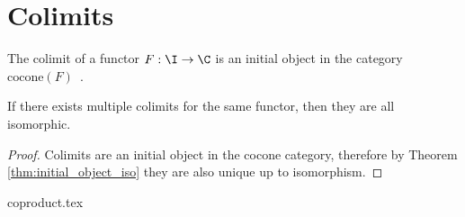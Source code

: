 \section{Colimits}

\begin{definition}[Colimit]
	The colimit of a functor $F:\I\to \C$ is an initial object in the category
	$\mathrm{cocone}(F)$~\parencite[p.~126]{leinster:basic_category_theory}.
\end{definition}

\begin{theorem}\label{thm:colimit_iso}
	If there exists multiple colimits for the same functor, then they are all
	isomorphic.

	\begin{proof}
		Colimits are an initial object in the cocone category, therefore by Theorem
		\ref{thm:initial_object_iso} they are also unique up to isomorphism.
	\end{proof}
\end{theorem}

{coproduct.tex}



